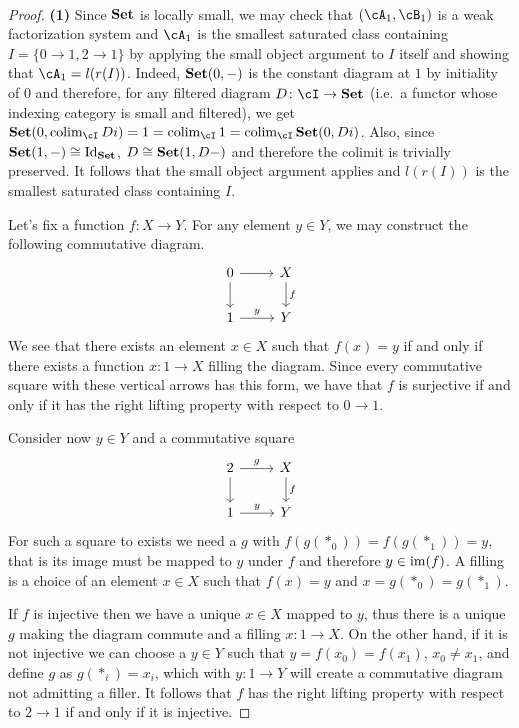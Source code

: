 \documentclass[a4paper,11pt,openany]{scrartcl}
\begin{document}
~\\
\begin{proof}
    \textbf{(1)} Since $\operatorname{\mathbf{Set}}$ is locally small, we may check that $(\cA_1,\cB_1)$ is a weak
    factorization system and $\cA_1$ is the smallest saturated class containing
    $I=\{0\rightarrow 1,2\rightarrow 1\}$ by applying the small object argument
    to $I$ itself and showing that $\cA_1=l(r(I))$. Indeed, $\operatorname{\mathbf{Set}}(0,-)$ is the
    constant diagram at $1$ by initiality of
    $0$ and therefore,
    for any filtered diagram $D\colon\cI\rightarrow\Set$ (i.e.\ a functor whose
    indexing category is small and filtered), we get
    $\Set(0,\colim_{\cI}Di)=1=\colim_{\cI}1=\colim_\cI\Set(0,Di)$. Also,
    since $\operatorname{\mathbf{Set}}(1,-)\cong\operatorname{Id}_{\operatorname{\mathbf{Set}}}$, $D\cong\operatorname{\mathbf{Set}}(1,D-)$ and therefore the colimit
    is trivially preserved. It follows that the small object argument applies
    and $l(r(I))$ is the smallest saturated class containing $I$.

    Let's fix a function $f\colon X\rightarrow Y$. For any element $y\in Y$, we
    may construct the following commutative diagram.
    \[
        \begin{tikzcd}
            0\ar[r]\ar[d]
            & X\ar[d, "f"] \\
            1\ar[r, "y"]
            & Y
        \end{tikzcd}
    \]
    We see that there exists an element $x\in X$ such that $f(x)=y$ if and only
    if there exists a function $x\colon 1\rightarrow X$ filling the diagram.
    Since every commutative square with these vertical arrows has this form, we
    have that $f$ is surjective if and only if it has the right lifting property
    with respect to $0\rightarrow 1$.

    Consider now $y\in Y$ and a commutative square
    \[
        \begin{tikzcd}
            2\ar[r, "g"]\ar[d]
            & X\ar[d, "f"] \\
            1\ar[r, "y"]
            & Y
        \end{tikzcd}
    \]
    For such a square to exists we need a $g$ with $f(g(*_0))=f(g(*_1))=y$, that
    is its image must be mapped to $y$ under $f$ and therefore $y\in\operatorname{im}(f)$.
    A filling is a choice of an element $x\in X$ such that $f(x)=y$ and
    $x=g(*_0)=g(*_1)$.

    \noindent If $f$ is injective then we have a unique $x\in X$ mapped
    to $y$, thus there is a unique $g$ making the diagram commute and a filling
    $x\colon 1\rightarrow X$. On the other hand, if it is not injective we can
    choose a $y\in Y$ such that $y=f(x_0)=f(x_1)$, $x_0\neq x_1$, and define $g$
    as $g(*_i)=x_i$, which with $y\colon 1\rightarrow Y$ will create a
    commutative diagram not admitting a filler. It follows that $f$ has the
    right lifting property with respect to $2\rightarrow 1$ if and only if it is
    injective.


\end{proof}
\end{document}
